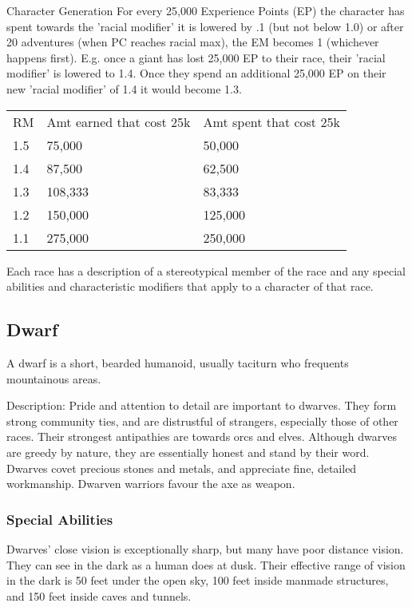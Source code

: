 \begin{Chapter}{Character Generation}
For every 25,000 Experience Points (EP) the character has spent
towards the 'racial modifier' it is lowered by .1 (but not below 1.0)
or after 20 adventures (when PC reaches racial max), the EM becomes 1
(whichever happens first).  E.g.  once a giant has lost 25,000 EP to
their race, their 'racial modifier' is lowered to 1.4.  Once they
spend an additional 25,000 EP on their new 'racial modifier' of 1.4 it
would become 1.3.

\begin{tabularx}{\columnwidth}{lXX}
RM	& Amt earned that cost 25k	& Amt spent that cost 25k  \\
1.5	& 75,000			& 50,000 \\
1.4	& 87,500			& 62,500 \\
1.3	& 108,333			& 83,333 \\
1.2	& 150,000			& 125,000 \\
1.1	& 275,000			& 250,000 \\
\end{tabularx}

Each race has a description of a stereotypical member of the race and
any special abilities and characteristic modifiers that apply to a
character of that race.

\subsection{Dwarf}

A dwarf is a short, bearded humanoid, usually taciturn who frequents
mountainous areas.

Description: Pride and attention to detail are important to dwarves.
They form strong community ties, and are distrustful of strangers,
especially those of other races. Their strongest antipathies are
towards orcs and elves.  Although dwarves are greedy by nature, they
are essentially honest and stand by their word. Dwarves covet precious
stones and metals, and appreciate fine, detailed workmanship.  Dwarven
warriors favour the axe as weapon.

\subsubsection{Special Abilities }

\begin{Enumerate}

\item Dwarves’ close vision is exceptionally sharp, but many have poor
  distance vision.  They can see in the dark as a human does at dusk.
  Their effective range of vision in the dark is 50 feet under the
  open sky, 100 feet inside manmade structures, and 150 feet inside
  caves and tunnels.


\end{Enumerate}
\end{Chapter}
